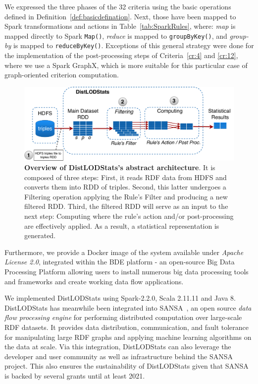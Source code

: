 We expressed the three phases of the 32 criteria using the basic operations defined in Definition~\ref{def:basicdefination}.
Next, those have been mapped to Spark transformations and actions in Table~\ref{tab:SparkRules}, where: \textit{map} is mapped directly to Spark \verb|Map()|, \textit{reduce} is mapped to \verb|groupByKey()|, and \textit{group-by} is mapped to \verb|reduceByKey()|.
Exceptions of this general strategy were done for the implementation of the post-processing steps of Criteria~\ref{cr:4} and \ref{cr:12}, where we use a Spark GraphX, which is more suitable for this particular case of graph-oriented criterion computation.


\begin{figure}
\centering
\includegraphics[width=1.0\textwidth]{images/4_distlodstats/distlodstats-system.pdf}
\caption{\textbf{Overview of DistLODStats's abstract architecture}. It is composed of three steps: First, it reads RDF data from HDFS and converts them into RDD of triples. Second, this latter undergoes a Filtering operation applying the Rule's Filter and producing a new filtered RDD. Third, the filtered RDD will serve as an input to the next step: Computing where the rule's action and/or post-processing are effectively applied. As a result, a statistical representation is generated.}
\label{fig:DistLODStatsSystem}
\end{figure}
Furthermore, we provide a Docker image of the system available under \textit{Apache License 2.0}, integrated within the BDE platform - an open-source Big Data Processing Platform allowing users to install numerous big data processing tools and frameworks and create working data flow applications.

We implemented DistLODStats using Spark-2.2.0, Scala 2.11.11 and Java 8. 
DistLODStats has meanwhile been integrated into SANSA~\cite{lehmann-2017-sansa-iswc,iermilov-2017-sansa-iswc-demo}, an open source \emph{data flow processing engine} for performing distributed computation over large-scale \gls{RDF} datasets. 
It provides data distribution, communication, and fault tolerance for manipulating large \gls{RDF} graphs and applying machine learning algorithms on the data at scale. 
Via this integration, DistLODStats can also leverage the developer and user community as well as infrastructure behind the SANSA project. 
This also ensures the sustainability of DistLODStats given that SANSA is backed by several grants until at least 2021.


